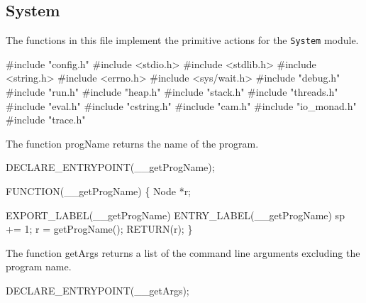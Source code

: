 %
%
\subsection{System}
The functions in this file implement the primitive actions for the
\texttt{System} module.

\nwenddocs{}\endmoddef\nwstartdeflinemarkup{}\nwenddeflinemarkup
#include "config.h"
#include <stdio.h>
#include <stdlib.h>
#include <string.h>
#include <errno.h>
#include <sys/wait.h>
#include "debug.h"
#include "run.h"
#include "heap.h"
#include "stack.h"
#include "threads.h"
#include "eval.h"
#include "cstring.h"
#include "cam.h"
#include "io_monad.h"
#include "trace.h"

\nwendcode{}\nwdocspar
The function {\Tt{}progName\nwendquote} returns the name of the program.

\nwenddocs{}\plusendmoddef\nwstartdeflinemarkup{}\nwenddeflinemarkup
DECLARE_ENTRYPOINT(__getProgName);

FUNCTION(__getProgName)
\{
    Node *r;

    EXPORT_LABEL(__getProgName)
 ENTRY_LABEL(__getProgName)
    sp += 1;
    r   = getProgName();
    RETURN(r);
\}

\nwendcode{}\nwdocspar
The function {\Tt{}getArgs\nwendquote} returns a list of the command line arguments
excluding the program name.

\nwenddocs{}\plusendmoddef\nwstartdeflinemarkup{}\nwenddeflinemarkup
DECLARE_ENTRYPOINT(__getArgs);

